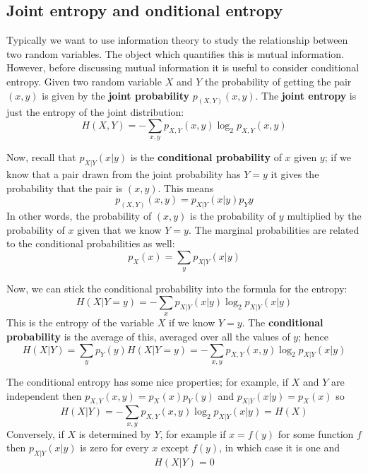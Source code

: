 \documentclass[12pt]{article}
\begin{document}
\subsection*{Joint entropy and onditional entropy}

Typically we want to use information theory to study the relationship
between two random variables. The object which quantifies this is
mutual information. However, before discussing mutual information it
is useful to consider conditional entropy. Given two random variable
$X$ and $Y$ the probability of getting the pair $(x,y)$ is given by
the \textbf{joint probability} $p_{(X,Y)}(x,y)$. The \textbf{joint entropy} is just the entropy of the joint distribution:
\begin{equation}
H(X,Y)=-\sum_{x,y}p_{X,Y}(x,y)\log_2{p_{X,Y}(x,y)}
\end{equation}

Now, recall that
$p_{X|Y}(x|y)$ is the \textbf{conditional probability} of $x$ given $y$; if we
know that a pair drawn from the joint probability has $Y=y$ it gives
the probability that the pair is $(x,y)$. This means
\begin{equation}
p_{(X,Y)}(x,y)=p_{X|Y}(x|y)p_Y{y}
\end{equation}
In other words, the probability of $(x,y)$ is the probability of $y$
multiplied by the probability of $x$ given that we know $Y=y$. The
marginal probabilities are related to the conditional probabilities as well:
\begin{equation}
p_X(x)=\sum_y p_{X|Y}(x|y)
\end{equation}

Now, we can stick the conditional probability into the formula for the entropy:
\begin{equation}
H(X|Y=y)=-\sum_{x} p_{X|Y}(x|y)\log_2{p_{X|Y}(x|y)}
\end{equation}
This is the entropy of the variable $X$ if we know $Y=y$. The \textbf{conditional probability} is the average of this, averaged over all the values of $y$; hence
\begin{equation}
H(X|Y)=\sum_y p_Y(y) H(X|Y=y)=-\sum_{x,y}p_{X,Y}(x,y)\log_2{p_{X|Y}(x|y)}
\end{equation}

The conditional entropy has some nice properties; for example, if $X$ and $Y$ are independent then $p_{X,Y}(x,y)=p_X(x)p_Y(y)$ and $p_{X|Y}(x|y)=p_X(x)$ so
\begin{equation}
H(X|Y)=-\sum_{x,y}p_{X,Y}(x,y)\log_2{p_{X|Y}(x|y)}=H(X)
\end{equation}
Conversely, if $X$ is determined by $Y$, for example if $x=f(y)$ for some function $f$ then $p_{X|Y}(x|y)$ is zero for every $x$ except $f(y)$, in which case it is one and
\begin{equation}
H(X|Y)=0
\end{equation}
\end{document}
